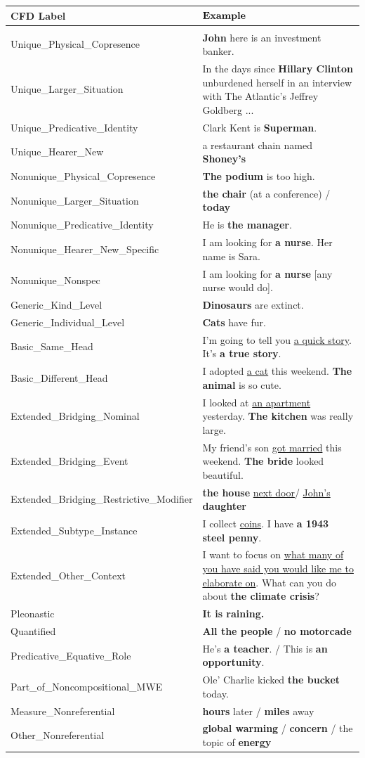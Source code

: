 \documentclass[landscape,final]{baposter}
\begin{document}
\begin{poster}
{\vspace{4pt}
\begin {center}\small
\smaller[.5]
\begin{tabular}{p{18em}p{32em}}
\hline{\bf CFD Label}&${\bf Example}$\\\hline\\Unique\_Physical\_Copresence & {\bf John} here is an investment banker.\\Unique\_Larger\_Situation & In the days since {\bf Hillary Clinton} unburdened herself in an interview with The Atlantic's Jeffrey Goldberg ...\\Unique\_Predicative\_Identity & Clark Kent is {\bf Superman}.\\Unique\_Hearer\_New & a restaurant chain named {\bf Shoney's}\\Nonunique\_Physical\_Copresence & {\bf The podium} is too high.\\Nonunique\_Larger\_Situation & {\bf the chair} (at a conference) / {\bf today}\\Nonunique\_Predicative\_Identity & He is {\bf the manager}.\\Nonunique\_Hearer\_New\_Specific & I am looking for {\bf a nurse}. Her name is Sara.\\Nonunique\_Nonspec & I am looking for {\bf a nurse} [any nurse would do].\\Generic\_Kind\_Level & {\bf Dinosaurs} are extinct.\\Generic\_Individual\_Level & {\bf Cats} have fur.\\Basic\_Same\_Head & I'm going to tell you \underline{a quick story}. It's {\bf a true story}.\\Basic\_Different\_Head & I adopted \underline{a cat} this weekend. {\bf The animal} is so cute.\\Extended\_Bridging\_Nominal & I looked at \underline{an apartment} yesterday. {\bf The kitchen} was really large.\\Extended\_Bridging\_Event & My friend's son \underline{got married} this weekend. {\bf The bride} looked beautiful.\\Extended\_Bridging\_Restrictive\_Modifier & {\bf the house} \underline{next door}/ \underline{John's} {\bf daughter}\\Extended\_Subtype\_Instance & I collect \underline{coins}. I have {\bf a 1943 steel penny}.\\Extended\_Other\_Context & I want to focus on \underline{what many of you have said you would like me to elaborate on}. What can you do about {\bf the climate crisis}?\\Pleonastic & {\bf It is raining.}\\Quantified & {\bf All the people} / {\bf no motorcade}\\Predicative\_Equative\_Role & He's {\bf a teacher}. / This is {\bf an opportunity}.\\Part\_of\_Noncompositional\_MWE & Ole' Charlie kicked {\bf the bucket} today.\\Measure\_Nonreferential & {\bf hours} later / {\bf miles} away\\Other\_Nonreferential & {\bf global warming} / {\bf concern} / the topic of {\bf energy} 

\end{tabular}
\end{center}}
\end{poster}
\end{document}
